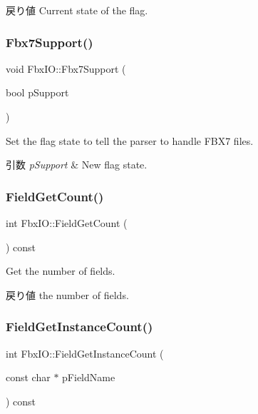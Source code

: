 \begin{DoxyReturn}{戻り値}
Current state of the flag. 
\end{DoxyReturn}
\mbox{\label{class_fbx_i_o_a8a5651ec131b0226da71e6ccbc3d3e48}} 
\subsubsection{\texorpdfstring{Fbx7\+Support()}{Fbx7Support()}\hspace{0.1cm}{\footnotesize\ttfamily [2/2]}}
{\footnotesize\ttfamily void Fbx\+I\+O\+::\+Fbx7\+Support (\begin{DoxyParamCaption}\item[{bool}]{p\+Support }\end{DoxyParamCaption})}

Set the flag state to tell the parser to handle F\+B\+X7 files. 
\begin{DoxyParams}{引数}
{\em p\+Support} & New flag state. \\
\hline
\end{DoxyParams}
\mbox{\label{class_fbx_i_o_a03e5080780554283a6ffedb11b8c352a}} 
\subsubsection{\texorpdfstring{Field\+Get\+Count()}{FieldGetCount()}}
{\footnotesize\ttfamily int Fbx\+I\+O\+::\+Field\+Get\+Count (\begin{DoxyParamCaption}{ }\end{DoxyParamCaption}) const}

Get the number of fields. \begin{DoxyReturn}{戻り値}
the number of fields. 
\end{DoxyReturn}
\mbox{\label{class_fbx_i_o_ae9e361e4efad6e15289bf0eafa651866}} 
\subsubsection{\texorpdfstring{Field\+Get\+Instance\+Count()}{FieldGetInstanceCount()}}
{\footnotesize\ttfamily int Fbx\+I\+O\+::\+Field\+Get\+Instance\+Count (\begin{DoxyParamCaption}\item[{const char $\ast$}]{p\+Field\+Name }\end{DoxyParamCaption}) const}

